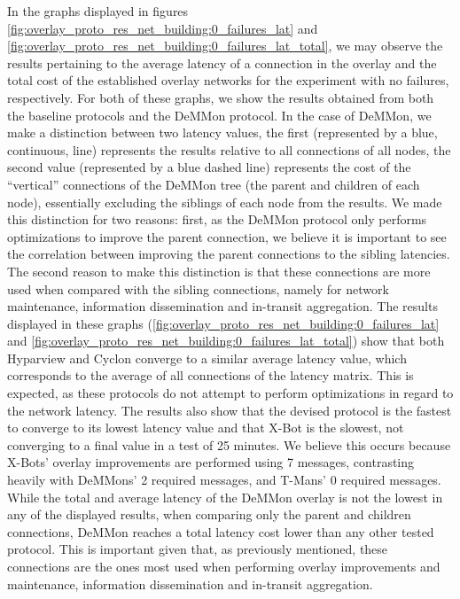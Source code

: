 In the graphs displayed in figures \ref{fig:overlay_proto_res_net_building:0_failures_lat} and \ref{fig:overlay_proto_res_net_building:0_failures_lat_total}, we may observe the results pertaining to the average latency of a connection in the overlay and the total cost of the established overlay networks for the experiment with no failures, respectively. For both of these graphs, we show the results obtained from both the baseline protocols and the DeMMon protocol. In the case of DeMMon, we make a distinction between two latency values, the first (represented by a blue, continuous, line) represents the results relative to all connections of all nodes, the second value (represented by a blue dashed line) represents the cost of the ``vertical'' connections of the DeMMon tree (the parent and children of each node), essentially excluding the siblings of each node from the results. We made this distinction for two reasons: first, as the DeMMon protocol only performs optimizations to improve the parent connection, we believe it is important to see the correlation between improving the parent connections to the sibling latencies. The second reason to make this distinction is that these connections are more used when compared with the sibling connections, namely for network maintenance, information dissemination and in-transit aggregation. The results displayed in these graphs (\ref{fig:overlay_proto_res_net_building:0_failures_lat} and \ref{fig:overlay_proto_res_net_building:0_failures_lat_total}) show that both Hyparview and Cyclon converge to a similar average latency value, which corresponds to the average of all connections of the latency matrix. This is expected, as these protocols do not attempt to perform optimizations in regard to the network latency. The results also show that the devised protocol is the fastest to converge to its lowest latency value and that X-Bot is the slowest, not converging to a final value in a test of 25 minutes. We believe this occurs because X-Bots' overlay improvements are performed using 7 messages, contrasting heavily with DeMMons' 2 required messages, and T-Mans' 0 required messages. While the total and average latency of the DeMMon overlay is not the lowest in any of the displayed results, when comparing only the parent and children connections, DeMMon reaches a total latency cost lower than any other tested protocol. This is important given that, as previously mentioned, these connections are the ones most used when performing overlay improvements and maintenance, information dissemination and in-transit aggregation. 

